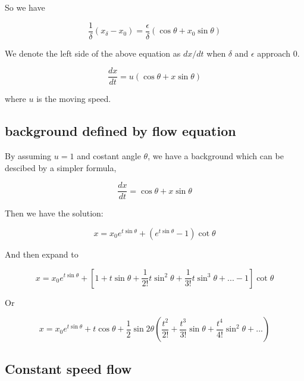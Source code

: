 \documentclass{article}
\begin{document}
So we have

\begin{equation}
    \frac{1}{\delta} (x_{\delta} - x_0) = \frac{\epsilon}{\delta} (\cos \theta + x_0 \sin \theta)
\end{equation}

We denote the left side of the above equation as $dx / dt$ when $\delta$ and $\epsilon$ approach 0.

\begin{equation}
    \frac{dx}{dt} = u (\cos \theta + x \sin \theta)
    \label{eqn:flow}
\end{equation}

where $u$ is the moving speed.

\subsection{background defined by flow equation}\label{sec:}

By assuming $u = 1$ and costant angle $\theta$, we have a background which can be descibed by a simpler formula,

\begin{equation}
    \frac{dx}{dt} = \cos \theta + x \sin \theta
\end{equation}

Then we have the solution:

\begin{equation}
   x = x_0 e^{t \sin \theta} + (e^{t \sin \theta} - 1) \cot \theta
\end{equation}

And then expand to

\begin{equation}
   x =  x_0 e^{t \sin \theta} + [1 + t \sin \theta + \frac{1}{2!} t\sin^2 \theta  + \frac{1}{3!} t \sin^3 \theta + ... - 1] \cot \theta
\end{equation}

Or

\begin{equation}
   x =  x_0 e^{t \sin \theta} + t \cos \theta + \frac{1}{2} \sin 2\theta (\frac{t^2}{2!} + \frac{t^3}{3!} \sin \theta + \frac{t^4}{4!} \sin^2 \theta + ...)
\end{equation}

\newpage

\subsection{Constant speed flow}\label{sec:csflow}
\end{document}
